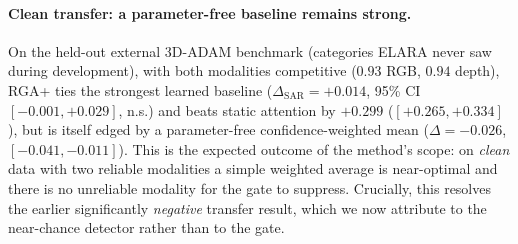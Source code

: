 \documentclass[10pt,conference]{IEEEtran}
\begin{document}
\begin{table}[t]
\centering
\caption{In-domain MVTec 3D-AD (supervised-paired) clean ROC-AUC with a
competitive patch-level PatchCore upstream detector. RGA+ exceeds the
frozen strongest baseline, not only static attention.}
\label{tab:v3-indomain}
\end{table}

\paragraph{Clean transfer: a parameter-free baseline remains strong.}
On the held-out external 3D-ADAM benchmark (categories ELARA never saw
during development), with both modalities competitive ($0.93$ RGB,
$0.94$ depth), RGA+ ties the strongest learned baseline
($\Delta_{\text{SAR}}=+0.014$, 95\% CI $[-0.001,+0.029]$, n.s.) and
beats static attention by $+0.299$ ($[+0.265,+0.334]$), but is itself
edged by a parameter-free confidence-weighted mean
($\Delta=-0.026$, $[-0.041,-0.011]$). This is the expected outcome of
the method's scope: on \emph{clean} data with two reliable modalities a
simple weighted average is near-optimal and there is no unreliable
modality for the gate to suppress. Crucially, this resolves the earlier
significantly \emph{negative} transfer result, which we now attribute to
the near-chance detector rather than to the gate.
\end{document}
